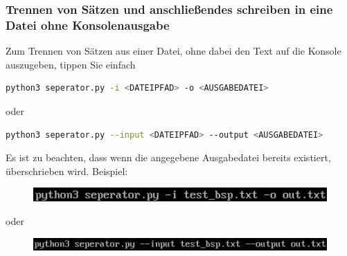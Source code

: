 \documentclass[12pt]{scrartcl}
\begin{document}
\subsubsection{Trennen von Sätzen und anschließendes schreiben in eine Datei ohne Konsolenausgabe}
\label{sec:first-steps-extraction-file-without}
Zum Trennen von Sätzen aus einer Datei, ohne dabei den Text auf die Konsole auszugeben, tippen Sie einfach 
\begin{lstlisting}[language=bash]
python3 seperator.py -i <DATEIPFAD> -o <AUSGABEDATEI>
\end{lstlisting}
\begin{center}
oder
\end{center}
\begin{lstlisting}[language=bash]
python3 seperator.py --input <DATEIPFAD> --output <AUSGABEDATEI>
\end{lstlisting} 
Es ist zu beachten, dass wenn die angegebene Ausgabedatei bereits existiert, überschrieben wird. 
Beispiel:
\begin{figure}[htbp]\includegraphics[width=1.0\textwidth]{ersteSchritteSeperatorIntoFileWithoutConsole001}\par\vspace{0.25cm}
\label{fig:ersteSchritteSeperatorIntoFileWithoutConsole001}
\end{figure}
\begin{center}
oder
\end{center}
\begin{figure}[htbp]
\includegraphics[width=1.0\textwidth]{ersteSchritteSeperatorIntoFileWithoutConsole002}\par
\vspace{0.25cm}
\label{fig:ersteSchritteSeperatorIntoFileWithoutConsole002}
\end{figure}
\begin{figure}[htbp]
\centering
\label{fig:ersteSchritteExtractIntoFileWithoutConsole003}
\end{figure}
\newpage
\end{document}
